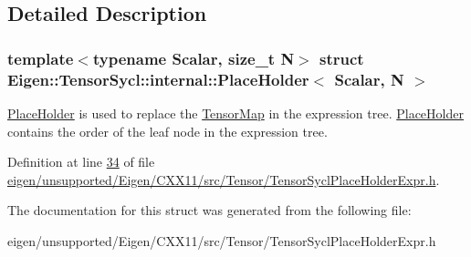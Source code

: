 \subsection{Detailed Description}
\subsubsection*{template$<$typename Scalar, size\+\_\+t N$>$\newline
struct Eigen\+::\+Tensor\+Sycl\+::internal\+::\+Place\+Holder$<$ Scalar, N $>$}

\hyperlink{struct_eigen_1_1_tensor_sycl_1_1internal_1_1_place_holder}{Place\+Holder} is used to replace the \hyperlink{class_eigen_1_1_tensor_map}{Tensor\+Map} in the expression tree. \hyperlink{struct_eigen_1_1_tensor_sycl_1_1internal_1_1_place_holder}{Place\+Holder} contains the order of the leaf node in the expression tree. 

Definition at line \hyperlink{eigen_2unsupported_2_eigen_2_c_x_x11_2src_2_tensor_2_tensor_sycl_place_holder_expr_8h_source_l00034}{34} of file \hyperlink{eigen_2unsupported_2_eigen_2_c_x_x11_2src_2_tensor_2_tensor_sycl_place_holder_expr_8h_source}{eigen/unsupported/\+Eigen/\+C\+X\+X11/src/\+Tensor/\+Tensor\+Sycl\+Place\+Holder\+Expr.\+h}.



The documentation for this struct was generated from the following file\+:\begin{DoxyCompactItemize}
\item 
eigen/unsupported/\+Eigen/\+C\+X\+X11/src/\+Tensor/\+Tensor\+Sycl\+Place\+Holder\+Expr.\+h\end{DoxyCompactItemize}
